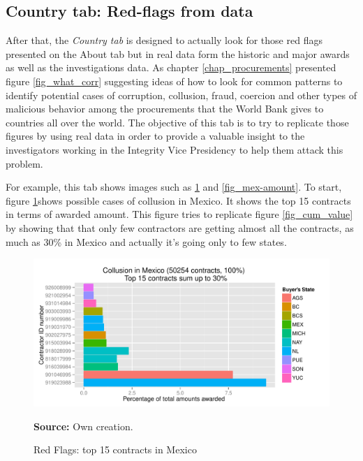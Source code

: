 \subsection{Country tab: Red-flags from data}

After that, the \textit{Country tab} is designed to actually look for those red flags presented on the About tab but in real data form the historic and major awards as well as the investigations data. As chapter \ref{chap_procurements} presented figure \ref{fig_what_corr} suggesting ideas of how to look for common patterns to identify potential cases of corruption, collusion, fraud, coercion and other types of malicious behavior among the procurements that the World Bank gives to countries all over the world. The objective of this tab is to try to replicate those figures by using real data in order to provide a valuable insight to the investigators working in the Integrity Vice Presidency to help them attack this problem.

For example, this tab shows images such as \ref{fig_mex-top15} and \ref{fig_mex-amount}. To start, figure  \ref{fig_mex-top15}shows possible cases of collusion in Mexico. It shows the top 15 contracts in terms of awarded amount. This figure tries to replicate figure \ref{fig_cum_value} by showing that that only few contractors are getting almost all the contracts, as much as 30\% in Mexico and actually it's going only to few states.
\begin{figure}[H]
\begin{center}
\caption{Red Flags: top 15 contracts in Mexico}
\label{fig_mex-top15}
\includegraphics[width=1.05\textwidth,keepaspectratio]{../img/mex-top-15.pdf}
\end{center}
\noindent \footnotesize{\textbf{Source:} Own creation.}
\end{figure}


